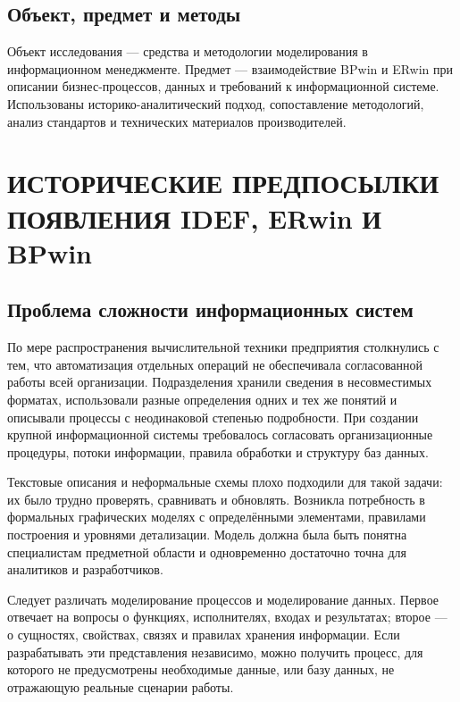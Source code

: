 \documentclass[essaypaper,paper]{pmk-graduate}
\begin{document}
\par

\section{Объект, предмет и методы}

Объект исследования — средства и методологии моделирования в информационном менеджменте. Предмет — взаимодействие BPwin и ERwin при описании бизнес-процессов, данных и требований к информационной системе. Использованы историко-аналитический подход, сопоставление методологий, анализ стандартов и технических материалов производителей.

\par

\chapter{ИСТОРИЧЕСКИЕ ПРЕДПОСЫЛКИ ПОЯВЛЕНИЯ IDEF, ERwin И BPwin}

\section{Проблема сложности информационных систем}

По мере распространения вычислительной техники предприятия столкнулись с тем, что автоматизация отдельных операций не обеспечивала согласованной работы всей организации. Подразделения хранили сведения в несовместимых форматах, использовали разные определения одних и тех же понятий и описывали процессы с неодинаковой степенью подробности. При создании крупной информационной системы требовалось согласовать организационные процедуры, потоки информации, правила обработки и структуру баз данных.

\par

Текстовые описания и неформальные схемы плохо подходили для такой задачи: их было трудно проверять, сравнивать и обновлять. Возникла потребность в формальных графических моделях с определёнными элементами, правилами построения и уровнями детализации. Модель должна была быть понятна специалистам предметной области и одновременно достаточно точна для аналитиков и разработчиков.

\par

Следует различать моделирование процессов и моделирование данных. Первое отвечает на вопросы о функциях, исполнителях, входах и результатах; второе — о сущностях, свойствах, связях и правилах хранения информации. Если разрабатывать эти представления независимо, можно получить процесс, для которого не предусмотрены необходимые данные, или базу данных, не отражающую реальные сценарии работы.
\end{document}
